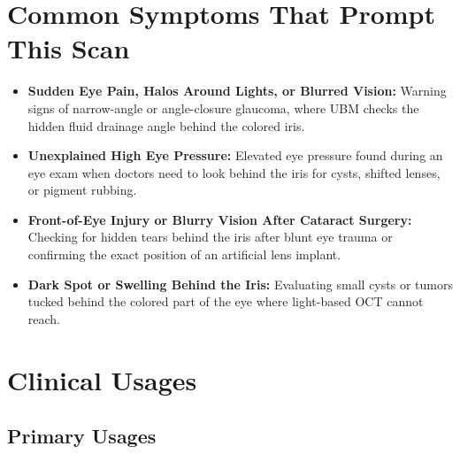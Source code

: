 \section{Common Symptoms That Prompt This Scan}
\begin{itemize}
    \item \textbf{Sudden Eye Pain, Halos Around Lights, or Blurred Vision:} Warning signs of narrow-angle or angle-closure glaucoma, where UBM checks the hidden fluid drainage angle behind the colored iris.
    \item \textbf{Unexplained High Eye Pressure:} Elevated eye pressure found during an eye exam when doctors need to look behind the iris for cysts, shifted lenses, or pigment rubbing.
    \item \textbf{Front-of-Eye Injury or Blurry Vision After Cataract Surgery:} Checking for hidden tears behind the iris after blunt eye trauma or confirming the exact position of an artificial lens implant.
    \item \textbf{Dark Spot or Swelling Behind the Iris:} Evaluating small cysts or tumors tucked behind the colored part of the eye where light-based OCT cannot reach.
\end{itemize}

\section{Clinical Usages}

\subsection{Primary Usages}

